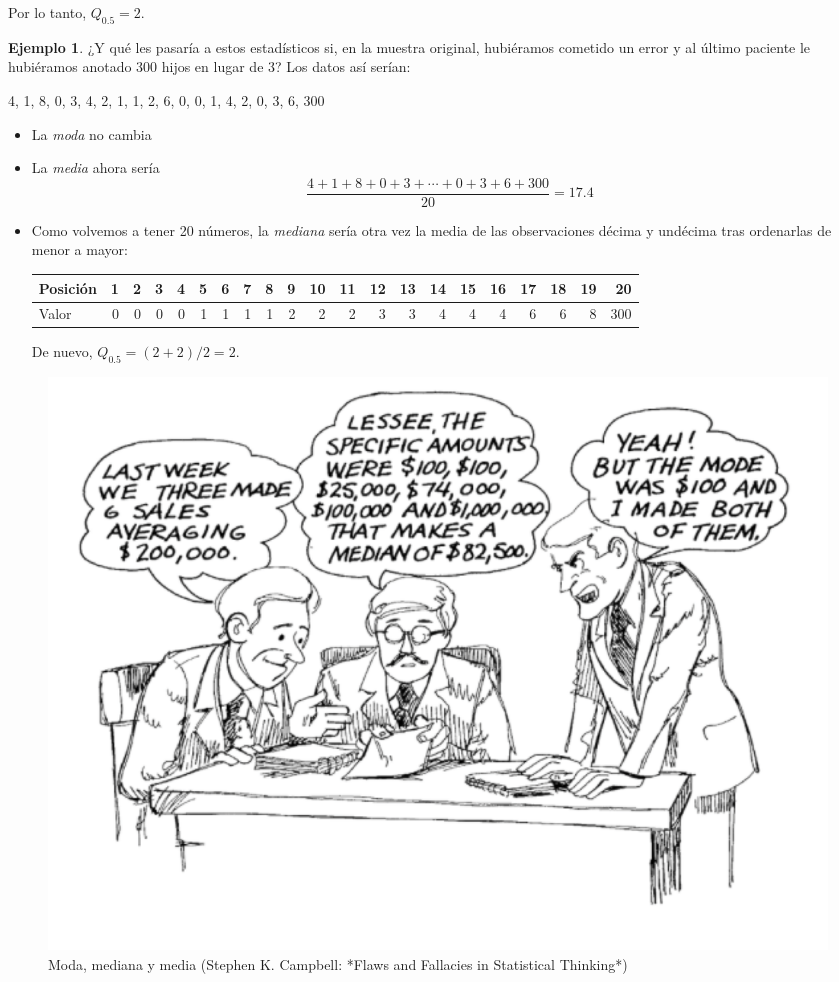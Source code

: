 \documentclass[
]{book}
\theoremstyle{definition}
\theoremstyle{definition}
\newtheorem{example}{Ejemplo}[chapter]
\theoremstyle{definition}
\theoremstyle{definition}
\theoremstyle{remark}
\begin{document}
Por lo tanto, \(Q_{0.5}=2\).

\begin{example}
\protect\hypertarget{exm:sexoger7}{}\label{exm:sexoger7}¿Y qué les pasaría a estos estadísticos si, en la muestra original, hubiéramos cometido un error y al último paciente le hubiéramos anotado 300 hijos en lugar de 3? Los datos así serían:
\end{example}

4, 1, 8, 0, 3, 4, 2, 1, 1, 2, 6, 0, 0, 1, 4, 2, 0, 3, 6, 300

\begin{itemize}
\item
  La \emph{moda} no cambia
\item
  La \emph{media} ahora sería
  \[
  \frac{4+1+8+0+3+\cdots+0+3+6+300}{20}=17.4
  \]
\item
  Como volvemos a tener 20 números, la \emph{mediana} sería otra vez la media de las observaciones décima y undécima tras ordenarlas de menor a mayor:

  \begin{table}
  \centering
  \begin{tabular}{l|r|r|r|r|r|r|r|r|r|r|r|r|r|r|r|r|r|r|r|r}
  \hline
  Posición & 1 & 2 & 3 & 4 & 5 & 6 & 7 & 8 & 9 & 10 & 11 & 12 & 13 & 14 & 15 & 16 & 17 & 18 & 19 & 20\\
  \hline
  Valor & 0 & 0 & 0 & 0 & 1 & 1 & 1 & 1 & 2 & 2 & 2 & 3 & 3 & 4 & 4 & 4 & 6 & 6 & 8 & 300\\
  \hline
  \end{tabular}
  \end{table}

  De nuevo, \(Q_{0.5}=(2+2)/2=2\).
\end{itemize}

\begin{figure}

{\centering \includegraphics[width=0.75\linewidth]{INREMDN_files/figure-html/median} 

}

\caption{Moda, mediana y media (Stephen K. Campbell: *Flaws and Fallacies in Statistical Thinking*)}\label{fig:median}
\end{figure}
\end{document}
